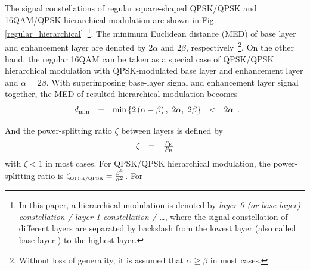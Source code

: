 \documentclass[conference]{IEEEtran}
\begin{document}
The signal constellations of regular square-shaped QPSK/QPSK and
16QAM/QPSK hierarchical modulation are shown in Fig.
\ref{regular_hierarchical}~\footnote{In this paper, a hierarchical
modulation is denoted by {\em layer 0 (or base layer)
constellation / layer 1 constellation / \ldots}, where the signal
constellation of different layers are separated by backslash from
the lowest layer (also called base layer ) to the highest layer.
}. The minimum Euclidean distance (MED) of base layer and
enhancement layer are denoted by $2\alpha$ and $2\beta$,
respectively~\footnote{Without loss of generality, it is assumed
that $\alpha\geq\beta$ in most cases.}. On the other hand, the
regular 16QAM can be taken as a special case of QPSK/QPSK
hierarchical modulation with QPSK-modulated base layer and
enhancement layer and $\alpha=2\beta$. With superimposing
base-layer signal and enhancement layer signal together, the MED
of resulted hierarchical modulation becomes
\begin{equation}
\begin{array}{rcccl}
d_{\rm min}& = & \min\left\{2\left(\alpha-\beta\right),\ 2\alpha,\
2\beta\right\}&<& 2\alpha
\end{array}.\label{Regular_MED}
\end{equation}
\begin{figure}
\end{figure}
\noindent And the power-splitting ratio $\zeta$ between layers is
defined by
\begin{equation}
\begin{array}{rcl}
\zeta & = & \frac{P_{\rm E}}{P_{\rm B}}
\end{array}\label{power_ratio}
\end{equation}
\noindent with $\zeta < 1$ in most cases. For QPSK/QPSK
hierarchical modulation, the power-splitting ratio is
$\zeta_{\mbox{\tiny QPSK/QPSK}}= \frac{\beta^{2}}{\alpha^2}$. For
\end{document}
